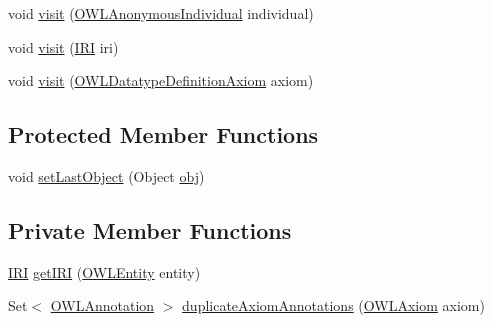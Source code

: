 \begin{DoxyCompactItemize}
\item 
void \hyperlink{classorg_1_1semanticweb_1_1owlapi_1_1util_1_1_o_w_l_object_duplicator_a6ccf45d3d55d54ab8a4e99256e5b8af4}{visit} (\hyperlink{interfaceorg_1_1semanticweb_1_1owlapi_1_1model_1_1_o_w_l_anonymous_individual}{O\-W\-L\-Anonymous\-Individual} individual)
\item 
void \hyperlink{classorg_1_1semanticweb_1_1owlapi_1_1util_1_1_o_w_l_object_duplicator_aa963c77d3917e14b8a9c086aff52e160}{visit} (\hyperlink{classorg_1_1semanticweb_1_1owlapi_1_1model_1_1_i_r_i}{I\-R\-I} iri)
\item 
void \hyperlink{classorg_1_1semanticweb_1_1owlapi_1_1util_1_1_o_w_l_object_duplicator_aeed8f120d613edb6adb4f1fa43628d74}{visit} (\hyperlink{interfaceorg_1_1semanticweb_1_1owlapi_1_1model_1_1_o_w_l_datatype_definition_axiom}{O\-W\-L\-Datatype\-Definition\-Axiom} axiom)
\end{DoxyCompactItemize}
\subsection*{Protected Member Functions}
\begin{DoxyCompactItemize}
\item 
void \hyperlink{classorg_1_1semanticweb_1_1owlapi_1_1util_1_1_o_w_l_object_duplicator_a2a4a649c5cea2e678ead3c94f5479574}{set\-Last\-Object} (Object \hyperlink{classorg_1_1semanticweb_1_1owlapi_1_1util_1_1_o_w_l_object_duplicator_aacc5a3aff516de182bd799f63dbcdec4}{obj})
\end{DoxyCompactItemize}
\subsection*{Private Member Functions}
\begin{DoxyCompactItemize}
\item 
\hyperlink{classorg_1_1semanticweb_1_1owlapi_1_1model_1_1_i_r_i}{I\-R\-I} \hyperlink{classorg_1_1semanticweb_1_1owlapi_1_1util_1_1_o_w_l_object_duplicator_a2e4fa6469f5a4c3a6801ef3c73bd5e40}{get\-I\-R\-I} (\hyperlink{interfaceorg_1_1semanticweb_1_1owlapi_1_1model_1_1_o_w_l_entity}{O\-W\-L\-Entity} entity)
\item 
Set$<$ \hyperlink{interfaceorg_1_1semanticweb_1_1owlapi_1_1model_1_1_o_w_l_annotation}{O\-W\-L\-Annotation} $>$ \hyperlink{classorg_1_1semanticweb_1_1owlapi_1_1util_1_1_o_w_l_object_duplicator_afecae68e5202861775dad210718e7af5}{duplicate\-Axiom\-Annotations} (\hyperlink{interfaceorg_1_1semanticweb_1_1owlapi_1_1model_1_1_o_w_l_axiom}{O\-W\-L\-Axiom} axiom)
\end{DoxyCompactItemize}
